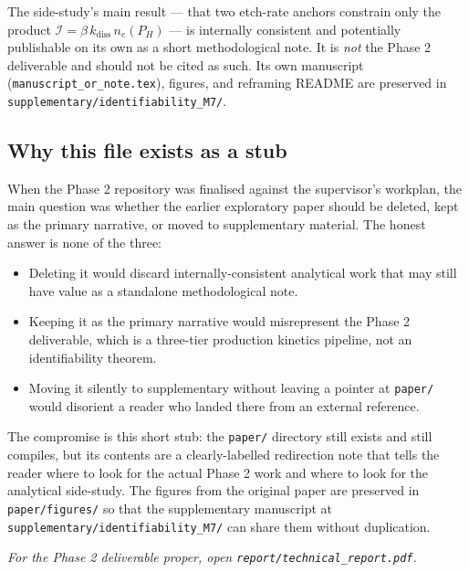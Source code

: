 \documentclass[11pt,a4paper]{article}
\begin{document}
The side-study's main result --- that two etch-rate anchors constrain
only the product $\mathcal{I} = \beta\,k_{\mathrm{diss}}\,n_e(P_H)$
--- is internally consistent and potentially publishable on its own as
a short methodological note. It is \emph{not} the Phase 2 deliverable
and should not be cited as such. Its own manuscript
(\texttt{manuscript\_or\_note.tex}), figures, and reframing README are
preserved in \texttt{supplementary/identifiability\_M7/}.

\subsection*{Why this file exists as a stub}

When the Phase 2 repository was finalised against the supervisor's
workplan, the main question was whether the earlier exploratory
paper should be deleted, kept as the primary narrative, or moved to
supplementary material. The honest answer is none of the three:

\begin{itemize}
  \item Deleting it would discard internally-consistent analytical
        work that may still have value as a standalone methodological
        note.
  \item Keeping it as the primary narrative would misrepresent the
        Phase 2 deliverable, which is a three-tier production
        kinetics pipeline, not an identifiability theorem.
  \item Moving it silently to supplementary without leaving a pointer
        at \texttt{paper/} would disorient a reader who landed there
        from an external reference.
\end{itemize}

The compromise is this short stub: the \texttt{paper/} directory still
exists and still compiles, but its contents are a clearly-labelled
redirection note that tells the reader where to look for the actual
Phase 2 work and where to look for the analytical side-study. The
figures from the original paper are preserved in
\texttt{paper/figures/} so that the supplementary manuscript at
\texttt{supplementary/identifiability\_M7/} can share them without
duplication.

\vspace{2em}
\begin{center}
\textit{For the Phase 2 deliverable proper, open
\texttt{report/technical\_report.pdf}.}
\end{center}
\end{document}
